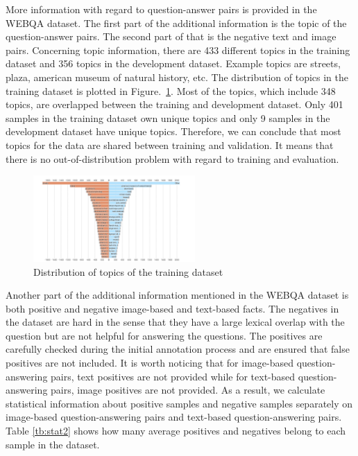 \documentclass[nohyperref]{article}
\theoremstyle{plain}
\theoremstyle{definition}
\theoremstyle{remark}
\begin{document}
    More information with regard to question-answer pairs is provided in the WEBQA dataset. The first part of the additional information is the topic of the question-answer pairs. The second part of that is the negative text and image pairs. Concerning topic information, there are 433 different topics in the training dataset and 356 topics in the development dataset. Example topics are streets, plaza, american museum of natural history, etc. The distribution of topics in the training dataset is plotted in Figure.~\ref{fig:topic_distr}. Most of the topics, which include 348 topics, are overlapped between the training and development dataset. Only 401 samples in the training dataset own unique topics and only 9 samples in the development dataset have unique topics. Therefore, we can conclude that most topics for the data are shared between training and validation. It means that there is no out-of-distribution problem with regard to training and evaluation.
    \begin{figure}[h]
        \center
        \includegraphics[width=0.55\textwidth]{img/topic_distribution.jpg}
        \caption{Distribution of topics of the training dataset}
        \label{fig:topic_distr}
    \end{figure}

    Another part of the additional information mentioned in the WEBQA dataset is both positive and negative image-based and text-based facts. The negatives in the dataset are hard in the sense that they have a large lexical overlap with the question but are not helpful for answering the questions. The positives are carefully checked during the initial annotation process and are ensured that false positives are not included. It is worth noticing that for image-based question-answering pairs, text positives are not provided while for text-based question-answering pairs, image positives are not provided. As a result, we calculate statistical information about positive samples and negative samples separately on image-based question-answering pairs and text-based question-answering pairs. Table \ref{tb:stat2} shows how many average positives and negatives belong to each sample in the dataset.
\end{document}
